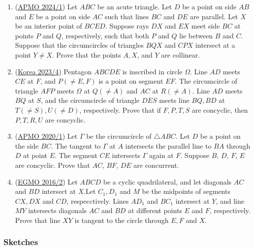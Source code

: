 \documentclass[11pt,paper=letter]{scrartcl}
\begin{document}
\begin{enumerate}[resume]
\item (\href{https://artofproblemsolving.com/community/c6h3368244p31340843}{APMO 2024/1}) Let $ABC$ be an acute triangle. Let $D$ be a point on side $AB$ and $E$ be a point on side $AC$ such that lines $BC$ and $DE$ are parallel. Let $X$ be an interior point of $BCED$. Suppose rays $DX$ and $EX$ meet side $BC$ at points $P$ and $Q$, respectively, such that both $P$ and $Q$ lie between $B$ and $C$. Suppose that the circumcircles of triangles $BQX$ and $CPX$ intersect at a point $Y \neq X$. Prove that the points $A, X$, and $Y$ are collinear. %

\item (\href{https://artofproblemsolving.com/community/c6h3190974p29111134}{Korea 2023/4}) Pentagon $ABCDE$ is inscribed in circle $\Omega$. Line $AD$ meets $CE$ at $F$, and $P (\neq E, F)$ is a point on segment $EF$. The circumcircle of triangle $AFP$ meets $\Omega$ at $Q(\neq A)$ and $AC$ at $R(\neq A)$. Line $AD$ meets $BQ$ at $S$, and the circumcircle of triangle $DES$ meets line $BQ, BD$ at $T(\neq S), U(\neq D)$, respectively. Prove that if $F, P, T, S$ are concyclic, then $P, T, R, U$ are concyclic. %

\item (\href{https://artofproblemsolving.com/community/c6h2140034p15706437}{APMO 2020/1}) Let $\Gamma$ be the circumcircle of $\triangle ABC$. Let $D$ be a point on the side $BC$. The tangent to $\Gamma$ at $A$ intersects the parallel line to $BA$ through $D$ at point $E$. The segment $CE$ intersects $\Gamma$ again at $F$. Suppose $B$, $D$, $F$, $E$ are concyclic. Prove that $AC$, $BF$, $DE$ are concurrent. %

\item (\href{https://artofproblemsolving.com/community/c6h1226672p6171514}{EGMO 2016/2}) Let $ABCD$ be a cyclic quadrilateral, and let diagonals $AC$ and $BD$ intersect at $X$.Let $C_1,D_1$ and $M$ be the midpoints of segments $CX,DX$ and $CD$, respecctively. Lines $AD_1$ and $BC_1$ intersect at $Y$, and line $MY$ intersects diagonals $AC$ and $BD$ at different points $E$ and $F$, respectively. Prove that line $XY$ is tangent to the circle through $E,F$ and $X$. %

\end{enumerate}

\subsubsection*{Sketches}
\end{document}
